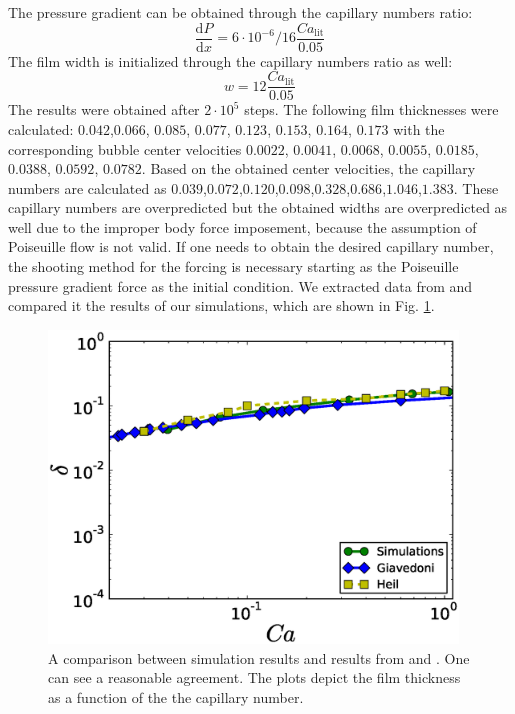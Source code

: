 \documentclass{article}
\begin{document}
The pressure gradient can be obtained through the capillary numbers
ratio:
\begin{equation}
\frac{\mathrm{d}P}{\mathrm{d} x}=6 \cdot 10^{-6}/16 \frac{Ca_{\mathrm{lit}}}{0.05}
\end{equation}
The film width is initialized through the capillary numbers ratio as well:
\begin{equation*}
w=12 \frac{Ca_{\mathrm{lit}}}{0.05}
\end{equation*}
The results were obtained after $2\cdot10^5$ steps. The following film thicknesses were
calculated: $0.042$,$0.066$, $0.085$, $0.077$, $0.123$, $0.153$, $0.164$, $0.173$ with
the corresponding bubble center velocities $0.0022$, $0.0041$, $0.0068$, $0.0055$,
$0.0185$, $0.0388$, $0.0592$, $0.0782$. Based on the obtained center velocities,
the capillary numbers are calculated as
$0.039$,$0.072$,$0.120$,$0.098$,$0.328$,$0.686$,$1.046$,$1.383$. These
capillary numbers are overpredicted but the obtained widths are overpredicted
as well due to the improper body force imposement, because the assumption of Poiseuille flow is not
valid. If one needs to obtain the desired capillary number, the shooting method for the forcing is
necessary starting as the Poiseuille pressure gradient force as the initial condition. We extracted
data from
\cite{giavedoni-numerical,heil-bretherton} and compared it the results of our
simulations, which are shown in Fig. \ref{fig:capillary:comparison}.
\begin{figure}
\includegraphics[width=0.97\textwidth]{Figures/Capillary/capillaries_comparison.eps}
\caption{A comparison between simulation results and results from
\cite{giavedoni-numerical} and \cite{heil-bretherton}. One can see a
reasonable agreement. The plots depict the film thickness as a function of the
the capillary number.\label{fig:capillary:comparison}}
\end{figure}
\end{document}
